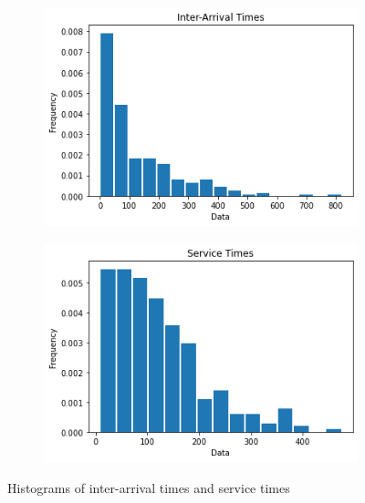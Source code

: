 \documentclass{article}
\begin{document}
\begin{figure}[h]
    \centering
    \begin{subfigure}[b]{0.45\textwidth}
        \centering
        \includegraphics[width=\textwidth]{fig1.png}
        \caption{}
        \label{fig:img1}
    \end{subfigure}
    \hfill
    \begin{subfigure}[b]{0.45\textwidth}
        \centering
        \includegraphics[width=\textwidth]{fig2.png}
        \caption{}
        \label{fig:img2}
    \end{subfigure}

    \caption{Histograms of inter-arrival times and service times}
    \label{fig:two-figs}
\end{figure}
\end{document}
